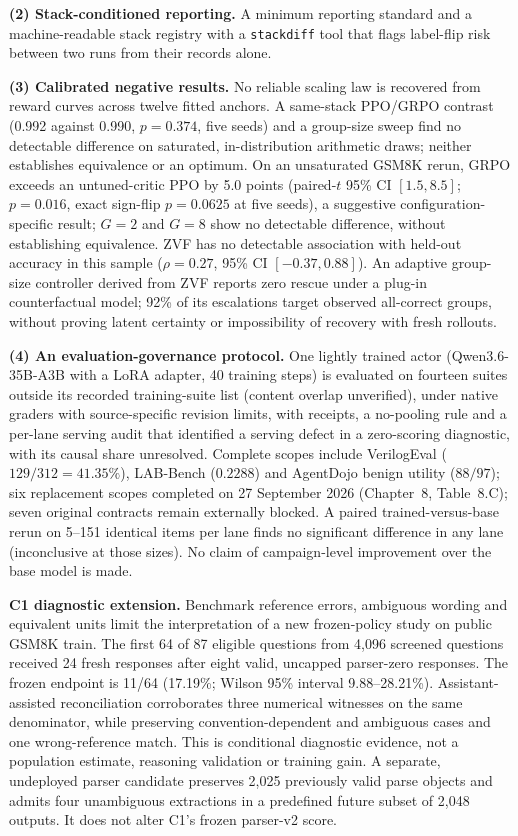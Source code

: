 \textbf{(2) Stack-conditioned reporting.} A minimum reporting standard and a
machine-readable stack registry with a \texttt{stackdiff} tool that flags
label-flip risk between two runs from their records alone.

\textbf{(3) Calibrated negative results.} No reliable scaling law is recovered
from reward curves across twelve fitted anchors. A same-stack PPO/GRPO
contrast (0.992 against 0.990, $p = 0.374$, five seeds) and a group-size sweep
find no detectable difference on saturated, in-distribution arithmetic draws;
neither establishes equivalence or an optimum. On an unsaturated GSM8K rerun, GRPO exceeds an
untuned-critic PPO by 5.0 points (paired-$t$ 95\% CI $[1.5, 8.5]$;
$p=0.016$, exact sign-flip $p=0.0625$ at five seeds), a suggestive
configuration-specific result; $G = 2$ and $G = 8$ show no detectable
difference, without establishing equivalence. ZVF has no detectable
association with held-out accuracy in this sample
($\rho = 0.27$, 95\% CI $[-0.37, 0.88]$). An adaptive group-size controller
derived from ZVF reports zero rescue under a plug-in counterfactual model;
92\% of its escalations target observed all-correct groups, without proving
latent certainty or impossibility of recovery with fresh rollouts.

\textbf{(4) An evaluation-governance protocol.} One lightly trained actor
(Qwen3.6-35B-A3B with a LoRA adapter, 40 training steps) is evaluated on
fourteen suites outside its recorded training-suite list (content overlap unverified), under native graders with source-specific revision limits, with
receipts, a no-pooling rule and a per-lane serving audit that identified a
serving defect in a zero-scoring diagnostic, with its causal share unresolved. Complete scopes include VerilogEval
($129/312 = 41.35\%$), LAB-Bench ($0.2288$) and AgentDojo benign utility
($88/97$); six replacement scopes completed on 27 September 2026
(Chapter~8, Table~8.C); seven original contracts remain externally blocked. A
paired trained-versus-base rerun on 5--151 identical items per lane finds no
significant difference in any lane (inconclusive at those sizes). No
claim of campaign-level improvement over the base model is made.


\textbf{C1 diagnostic extension.} Benchmark reference errors, ambiguous wording and equivalent units limit the interpretation of a new frozen-policy study on public GSM8K train. The first 64 of 87 eligible questions from 4,096 screened questions received 24 fresh responses after eight valid, uncapped parser-zero responses. The frozen endpoint is 11/64 (17.19\%; Wilson 95\% interval 9.88--28.21\%). Assistant-assisted reconciliation corroborates three numerical witnesses on the same denominator, while preserving convention-dependent and ambiguous cases and one wrong-reference match. This is conditional diagnostic evidence, not a population estimate, reasoning validation or training gain. A separate, undeployed parser candidate preserves 2,025 previously valid parse objects and admits four unambiguous extractions in a predefined future subset of 2,048 outputs. It does not alter C1's frozen parser-v2 score.

